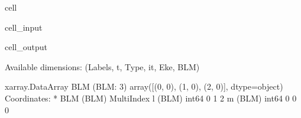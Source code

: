 \documentclass[letterpaper,table,10pt,english]{jupyterBook}
\begin{document}
\begin{sphinxuseclass}{cell}\begin{sphinxVerbatimInput}

\begin{sphinxuseclass}{cell_input}
\begin{sphinxVerbatim}[commandchars=\\\{\}]


\end{sphinxVerbatim}

\end{sphinxuseclass}\end{sphinxVerbatimInput}
\begin{sphinxVerbatimOutput}

\begin{sphinxuseclass}{cell_output}
\begin{sphinxVerbatim}[commandchars=\\\{\}]
Available dimensions: (\PYGZsq{}Labels\PYGZsq{}, \PYGZsq{}t\PYGZsq{}, \PYGZsq{}Type\PYGZsq{}, \PYGZsq{}it\PYGZsq{}, \PYGZsq{}Eke\PYGZsq{}, \PYGZsq{}BLM\PYGZsq{})
\end{sphinxVerbatim}

\begin{sphinxVerbatim}[commandchars=\\\{\}]
\PYGZlt{}xarray.DataArray \PYGZsq{}BLM\PYGZsq{} (BLM: 3)\PYGZgt{}
array([(0, 0), (1, 0), (2, 0)], dtype=object)
Coordinates:
  * BLM      (BLM) MultiIndex
  \PYGZhy{} l        (BLM) int64 0 1 2
  \PYGZhy{} m        (BLM) int64 0 0 0
\end{sphinxVerbatim}

\end{sphinxuseclass}\end{sphinxVerbatimOutput}

\end{sphinxuseclass}
\end{document}
